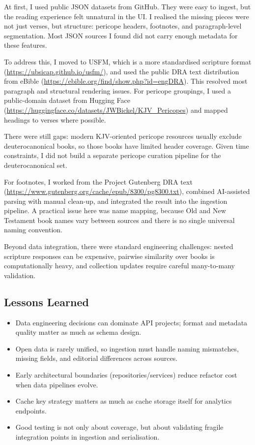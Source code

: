 \documentclass[11pt,a4paper]{article}
\begin{document}
At first, I used public JSON datasets from GitHub. They were easy to ingest, but the reading experience felt unnatural in the UI. I realised the missing pieces were not just verses, but structure: pericope headers, footnotes, and paragraph-level segmentation. Most JSON sources I found did not carry enough metadata for these features.

To address this, I moved to USFM, which is a more standardised scripture format (\url{https://ubsicap.github.io/usfm/}), and used the public DRA text distribution from eBible (\url{https://ebible.org/find/show.php?id=engDRA}). This resolved most paragraph and structural rendering issues. For pericope groupings, I used a public-domain dataset from Hugging Face (\url{https://huggingface.co/datasets/JWBickel/KJV_Pericopes}) and mapped headings to verses where possible.

There were still gaps: modern KJV-oriented pericope resources usually exclude deuterocanonical books, so those books have limited header coverage. Given time constraints, I did not build a separate pericope curation pipeline for the deuterocanonical set.

For footnotes, I worked from the Project Gutenberg DRA text (\url{https://www.gutenberg.org/cache/epub/8300/pg8300.txt}), combined AI-assisted parsing with manual clean-up, and integrated the result into the ingestion pipeline. A practical issue here was name mapping, because Old and New Testament book names vary between sources and there is no single universal naming convention.

Beyond data integration, there were standard engineering challenges: nested scripture responses can be expensive, pairwise similarity over books is computationally heavy, and collection updates require careful many-to-many validation.

\subsection{Lessons Learned}
\begin{itemize}[leftmargin=*]
	\item Data engineering decisions can dominate API projects; format and metadata quality matter as much as schema design.
	\item Open data is rarely unified, so ingestion must handle naming mismatches, missing fields, and editorial differences across sources.
	\item Early architectural boundaries (repositories/services) reduce refactor cost when data pipelines evolve.
	\item Cache key strategy matters as much as cache storage itself for analytics endpoints.
	\item Good testing is not only about coverage, but about validating fragile integration points in ingestion and serialisation.
\end{itemize}
\end{document}
